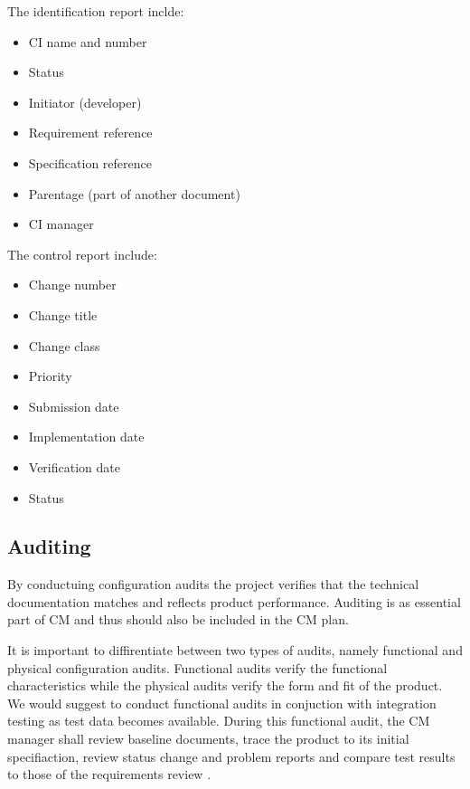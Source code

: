 \documentclass[a4paper]{article}
\begin{document}
The identification report inclde:
\begin{itemize}
  \item CI name and number
  \item Status
  \item Initiator (developer)
  \item Requirement reference
  \item Specification reference
  \item Parentage (part of another document)
  \item CI manager
\end{itemize}

The control report include:
\begin{itemize}
  \item Change number
  \item Change title
  \item Change class
  \item Priority
  \item Submission date
  \item Implementation date
  \item Verification date
  \item Status
\end{itemize}

\subsection{Auditing}

By conductuing configuration audits the project verifies that the technical documentation matches and reflects product performance. Auditing is as essential part of CM and thus should also be included in the CM plan.

It is important to diffirentiate between two types of audits, namely functional and physical configuration audits. Functional audits verify the functional characteristics while the physical audits verify the form and fit of the product. We would suggest to conduct functional audits in conjuction with integration testing as test data becomes available. During this functional audit, the CM manager shall review baseline documents, trace the product to its initial specifiaction, review status change and problem reports and compare test results to those of the requirements review \cite{daniels}. 
\end{document}
